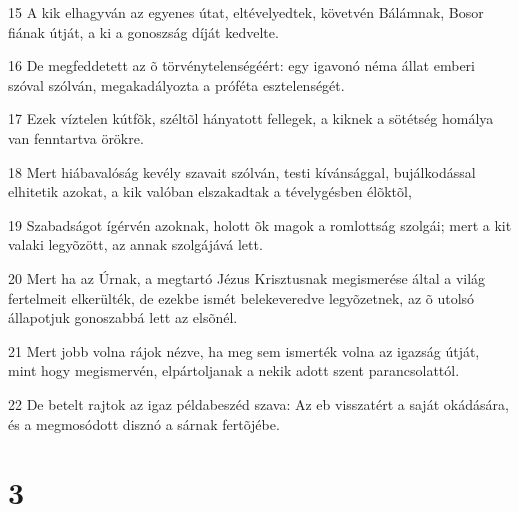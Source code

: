 \par 15 A kik elhagyván az egyenes útat, eltévelyedtek, követvén Bálámnak, Bosor fiának útját, a ki a gonoszság díját kedvelte.
\par 16 De megfeddetett az õ törvénytelenségéért: egy igavonó néma állat emberi szóval szólván, megakadályozta a próféta esztelenségét.
\par 17 Ezek víztelen kútfõk, széltõl hányatott fellegek, a kiknek a sötétség homálya van fenntartva örökre.
\par 18 Mert hiábavalóság kevély szavait szólván, testi kívánsággal, bujálkodással elhitetik azokat, a kik valóban elszakadtak a tévelygésben élõktõl,
\par 19 Szabadságot ígérvén azoknak, holott õk magok a romlottság szolgái; mert a kit valaki legyõzött, az annak szolgájává lett.
\par 20 Mert ha az Úrnak, a megtartó Jézus Krisztusnak megismerése által a világ fertelmeit elkerülték, de ezekbe ismét belekeveredve legyõzetnek, az õ utolsó állapotjuk  gonoszabbá lett az elsõnél.
\par 21 Mert jobb volna rájok nézve, ha meg sem ismerték volna az igazság útját, mint hogy megismervén, elpártoljanak a nekik adott szent parancsolattól.
\par 22 De betelt rajtok az igaz példabeszéd szava: Az eb visszatért a saját okádására, és a megmosódott disznó a sárnak fertõjébe.

\chapter{3}

